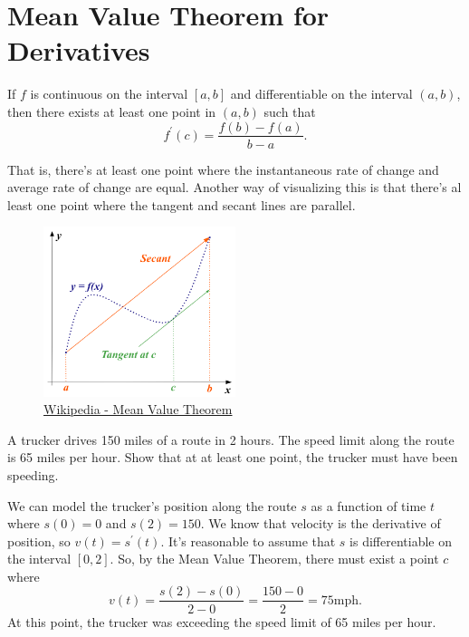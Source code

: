 \section{Mean Value Theorem for Derivatives}
\begin{theorem}
	If $f$ is continuous on the interval $[a,b]$ and differentiable on the interval $(a,b)$, then there exists at least one point in $(a,b)$ such that
	\begin{equation*}
		f^\prime(c) = \frac{f(b)-f(a)}{b-a}.
	\end{equation*}
\end{theorem}

That is, there's at least one point where the instantaneous rate of change and average rate of change are equal.
Another way of visualizing this is that there's al least one point where the tangent and secant lines are parallel.

\begin{figure}[H]
	\label{mvt}
	\centering
	\includegraphics[width = 0.5\textwidth]{./applications_derivative/mvt.png}
	\caption{\hyperref{https://en.wikipedia.org/wiki/Mean\_value\_theorem}{}{}{Wikipedia - Mean Value Theorem}}
\end{figure}

\begin{example}
	A trucker drives 150 miles of a route in 2 hours.
	The speed limit along the route is 65 miles per hour.
	Show that at at least one point, the trucker must have been speeding.
\end{example}
\begin{answer}
	We can model the trucker's position along the route $s$ as a function of time $t$ where $s(0)=0$ and $s(2)=150$.
	We know that velocity is the derivative of position, so $v(t) = s^\prime(t)$.
	It's reasonable to assume that $s$ is differentiable on the interval $[0,2]$.
	So, by the Mean Value Theorem, there must exist a point $c$ where
	\begin{equation*}
		v(t) = \frac{s(2)-s(0)}{2-0} = \frac{150-0}{2} = 75\text{mph}.
	\end{equation*}
	At this point, the trucker was exceeding the speed limit of 65 miles per hour.
\end{answer}


